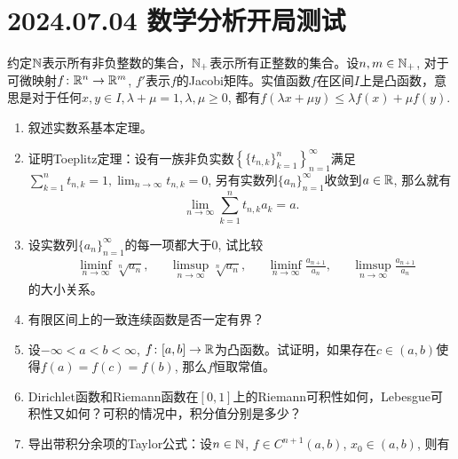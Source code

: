 \section*{2024.07.04 数学分析开局测试}
约定$\mathbb{N}$表示所有非负整数的集合，$\mathbb{N_+}$表示所有正整数的集合。设$n,m\in\mathbb{N_+}$, 对于可微映射$f\colon \mathbb{R}^n\to\mathbb{R}^m$, $f'$表示$f$的Jacobi矩阵。实值函数$f$在区间$I$上是凸函数，意思是对于任何$x,y\in I,\lambda+\mu=1,\lambda,\mu\geqslant 0$, 都有$f(\lambda x+\mu y)\leqslant \lambda f(x)+\mu f(y)$.
\begin{enumerate}
    \item 叙述实数系基本定理。
    \item 证明Toeplitz定理：设有一族非负实数$\left\{\{t_{n,k}\}_{k=1}^n\right\}_{n=1}^\infty$满足$\sum_{k=1}^{n}t_{n,k}=1,\lim_{n\to\infty}t_{n,k}=0$, 另有实数列$\{a_n\}_{n=1}^\infty$收敛到$a\in \mathbb{R}$, 那么就有\begin{equation*}
        \lim_{n\to \infty}\sum_{k=1}^{n}t_{n,k}a_k=a.
    \end{equation*}
    \item 设实数列$\{a_n\}_{n=1}^{\infty}$的每一项都大于0, 试比较\begin{align*}
        &\liminf_{n\to\infty}\sqrt[n]{a_n},&&\limsup_{n\to\infty}\sqrt[n]{a_n},&&\liminf_{n\to\infty}\frac{a_{n+1}}{a_n},&&\limsup_{n\to\infty}\frac{a_{n+1}}{a_n}
    \end{align*}的大小关系。
    \item 有限区间上的一致连续函数是否一定有界？
    \item 设$-\infty<a<b<\infty$, $f\colon [a,b]\to\mathbb{R}$为凸函数。试证明，如果存在$c\in(a,b)$使得$f(a)=f(c)=f(b)$, 那么$f$恒取常值。
    \item Dirichlet函数和Riemann函数在$[0,1]$上的Riemann可积性如何，Lebesgue可积性又如何？可积的情况中，积分值分别是多少？
    \item 导出带积分余项的Taylor公式：设$n\in\mathbb{N}$, $f\in C^{n+1}(a,b)$, $x_0\in (a,b)$, 则有\begin{equation*}

\end{equation*}
\end{enumerate}
